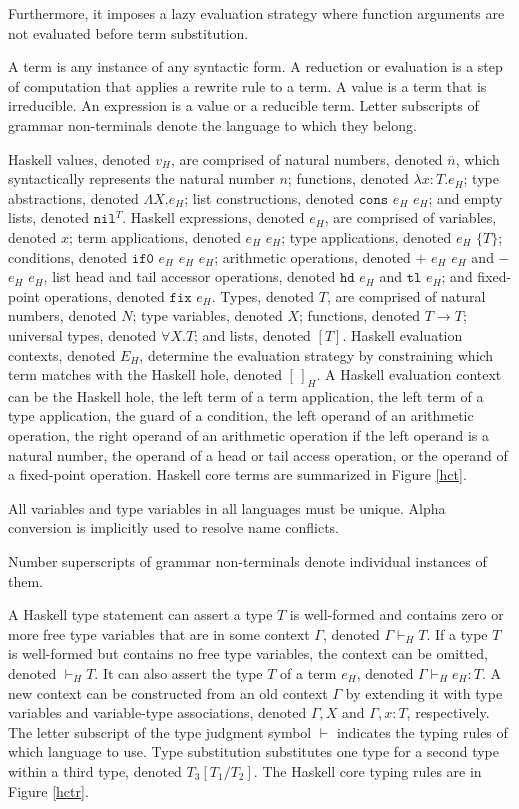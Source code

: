 Furthermore, it imposes a lazy evaluation strategy where function arguments are not evaluated before term substitution.

A term is any instance of any syntactic form.  A reduction or evaluation is a step of computation that applies a rewrite rule to a term.  A value is a term that is irreducible.  An expression is a value or a reducible term.  Letter subscripts of grammar non-terminals denote the language to which they belong.

Haskell values, denoted $v_{H}$, are comprised of natural numbers, denoted $\overline{n}$, which syntactically represents the natural number $n$; functions, denoted $\lambda x:T.e_{H}$; type abstractions, denoted $\Lambda X.e_{H}$; list constructions, denoted $\mathtt{cons}$ $e_{H}$ $e_{H}$; and empty lists, denoted $\mathtt{nil}^{T}$.  Haskell expressions, denoted $e_{H}$, are comprised of variables, denoted $x$; term applications, denoted $e_{H}$ $e_{H}$; type applications, denoted $e_{H}$ $\lbrace T\rbrace$; conditions, denoted $\mathtt{if0}$ $e_{H}$ $e_{H}$ $e_{H}$; arithmetic operations, denoted $+$ $e_{H}$ $e_{H}$ and $-$ $e_{H}$ $e_{H}$, list head and tail accessor operations, denoted $\mathtt{hd}$ $e_{H}$ and $\mathtt{tl}$ $e_{H}$; and fixed-point operations, denoted $\mathtt{fix}$ $e_{H}$.  Types, denoted $T$, are comprised of natural numbers, denoted $N$; type variables, denoted $X$; functions, denoted $T\rightarrow T$; universal types, denoted $\forall X.T$; and lists, denoted $[T]$.  Haskell evaluation contexts, denoted $E_{H}$, determine the evaluation strategy by constraining which term matches with the Haskell hole, denoted $[\,]_{H}$.  A Haskell evaluation context can be the Haskell hole, the left term of a term application, the left term of a type application, the guard of a condition, the left operand of an arithmetic operation, the right operand of an arithmetic operation if the left operand is a natural number, the operand of a head or tail access operation, or the operand of a fixed-point operation.  Haskell core terms are summarized in Figure \ref{hct}.



All variables and type variables in all languages must be unique.  Alpha conversion is implicitly used to resolve name conflicts.

Number superscripts of grammar non-terminals denote individual instances of them.

A Haskell type statement can assert a type $T$ is well-formed and contains zero or more free type variables that are in some context $\Gamma$, denoted $\Gamma\vdash_{H}T$.  If a type $T$ is well-formed but contains no free type variables, the context can be omitted, denoted $\vdash_{H}T$.  It can also assert the type $T$ of a term $e_{H}$, denoted $\Gamma\vdash_{H}e_{H}:T$.  A new context can be constructed from an old context $\Gamma$ by extending it with type variables and variable-type associations, denoted $\Gamma,X$ and $\Gamma,x:T$, respectively.  The letter subscript of the type judgment symbol $\vdash$ indicates the typing rules of which language to use.  Type substitution substitutes one type for a second type within a third type, denoted $T_{3}[T_{1}/T_{2}]$.  The Haskell core typing rules are in Figure \ref{hctr}.

